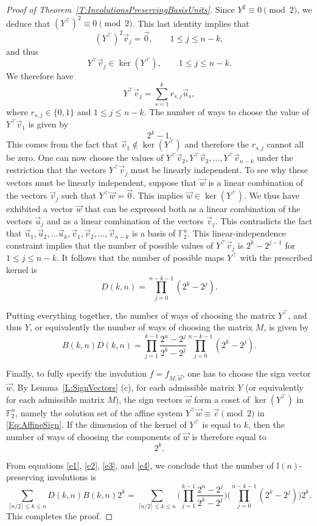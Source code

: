 \documentclass[12pt]{amsart}
\theoremstyle{plain}
\theoremstyle{definition}
\numberwithin{equation}{section}
\newcommand{\mI}{\mathbb{I}}
\begin{document}
\begin{proof}[Proof of Theorem~\ref{T:InvolutionsPreservingBasisUnits}]
Since $Y^2\equiv 0\pmod 2$, we deduce that $(Y^\top)^2\equiv 0 \pmod 2$. This last identity implies that
\[
(Y^\top)^2 \vec{v}_j=\vec{0},\qquad 1\le j\le n-k,
\]
and thus
\[
Y^\top \vec{v}_j\in \ker (Y^\top ),\qquad 1\le j\le n-k.
\]
We therefore have
\[
    Y^\top\vec{v}_j=\sum_{s=1}^k r_{s,j} \vec{u}_s , 
\]
where $r_{s, j} \in \{ 0 , 1 \}$ and $1 \leq j \leq n - k$. The number of ways to choose the value of $Y^\top\vec{v}_1$ is given by
\[
2^k-1.
\]
This comes from the fact that $\vec{v}_1 \not\in \ker (Y^{\top})$ and therefore the $r_{s, j}$ cannot all be zero. One can now choose the values of $Y^\top \vec{v}_2, Y^\top\vec{v}_3,\ldots , Y^\top \vec{v}_{n - k}$ under the restriction that the vectors $Y^\top \vec{v}_j$ must be linearly independent. To see why these vectors must be linearly independent, suppose that $\vec{w}$ is a linear combination of the vectors $\vec{v}_j$ such that $Y^\top\vec{w}=\vec{0}$.  This implies $\vec{w}\in \ker (Y^\top )$.  We thus have exhibited a vector $\vec{w}$ that can be expressed both as a linear combination of the vectors $\vec{u}_j$ and as a linear combination of the vectors $\vec{v}_j$.  This contradicts the fact that  $\vec{u}_1,\vec{u}_2,\ldots \vec{u}_k,\vec{v}_1, \vec{v}_2,\ldots,\vec{v}_{n-k}$ is a basis of $\mathbb F_2^n$. This linear-independence constraint implies that the number of possible values of $Y^\top\vec{v}_j$ is $2^k-2^{j-1}$ for $1 \leq j \leq n - k$. It follows that the number of possible maps $Y^{\top}$ with the prescribed kernel is
\begin{equation}\label{e3}
D(k,n)=\prod_{j=0}^{n-k-1}(2^k-2^j).
\end{equation}

Putting everything together, the number of ways of choosing the matrix $Y^\top$, and thus $Y$, or equivalently the number of ways of choosing the matrix $M$, is given by
\[
B(k,n)D(k,n)=\prod_{j=1}^{k-1}\frac{2^n-2^j}{2^k-2^j}\prod_{j=0}^{n-k-1}(2^k-2^j).
\]

Finally, to fully specify the involution $f = f_{M, \vec w}$, one has to choose the sign vector $\vec w$. By Lemma~\ref{L:SignVectors} (c), for each admissible matrix $Y$ (or equivalently for each admissible matrix $M$), the sign vectors $\vec w$ form a coset of $\ker (Y^{\top})$ in $\mathbb F_2^n$, namely the solution set of the affine system $Y^{\top} \vec w \equiv \vec c \pmod 2$ in \eqref{Eq:AffineSign}. If the dimension of the kernel of $Y^\top$ is equal to $k$, then the number of ways of choosing the components of $\vec{w}$ is therefore equal to
\begin{equation}\label{e4}
2^k.
\end{equation}

From equations \eqref{e1}, \eqref{e2}, \eqref{e3}, and \eqref{e4}, we conclude that the number of $\mI(n)$-preserving involutions is
\[
\sum_{\lceil n/2 \rceil \le k\le n}D(k,n)B(k,n)2^k=\sum_{\lceil n/2 \rceil \le k\le n} \Big( \prod_{j = 1}^{k-1} \frac{2^n - 2^j}{2^k - 2^j} \Big) \Big( \prod_{j = 0}^{n-k-1} (2^k - 2^j) \Big) 2^k.
\]
This completes the proof.
\end{proof}
\end{document}
